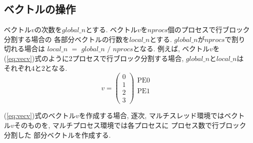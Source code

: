 \documentclass[a4paper]{jarticle}
\begin{document}
{{\subsection{ベクトルの操作}
ベクトル$v$の次数を$global\_n$とする. 
ベクトル$v$を$nprocs$個のプロセスで行ブロック分割する場合の
各部分ベクトルの行数を$local\_n$とする. 
$global\_n$が$nprocs$で割り切れる場合は
$local\_n$ $=$ $global\_n$ $/$ $nprocs$となる. 
例えば, 
ベクトル$v$を(\ref{eq:vecv})式のように2プロセスで行ブロック分割する場合, 
$global\_n$と$local\_n$はそれぞれ$4$と$2$となる. 
\begin{equation}
v = 
\left(
\begin{array}{c}
0 \\
1 \\ \hline
2 \\
3  
\end{array}
\right)
\begin{array}{l}
\mbox{PE0} \\
    \\
\mbox{PE1} \\
   \\ 
\end{array}
\label{eq:vecv}
\end{equation}

(\ref{eq:vecv})式のベクトル$v$を作成する場合, 
逐次, マルチスレッド環境ではベクトル$v$そのものを, マルチプロセス環境では各プロセスに
プロセス数で行ブロック分割した
部分ベクトルを作成する. 

}}
\end{document}
